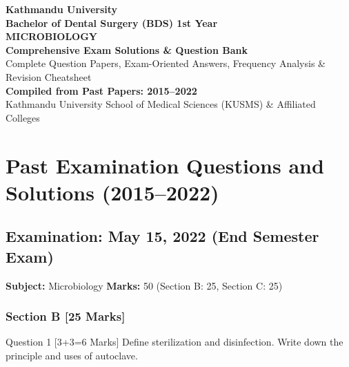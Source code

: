\documentclass[11pt,a4paper]{article}
\begin{document}
\begin{titlepage}
    \centering
    \vspace*{2cm}
    {\Huge \textbf{Kathmandu University}}\\[0.5cm]
    {\LARGE \textbf{Bachelor of Dental Surgery (BDS) 1st Year}}\\[1.5cm]
    {\Huge \textbf{MICROBIOLOGY}}\\[0.8cm]
    {\Large \textbf{Comprehensive Exam Solutions \& Question Bank}}\\[0.5cm]
    {\large Complete Question Papers, Exam-Oriented Answers, Frequency Analysis \& Revision Cheatsheet}\\[2cm]
    \vfill
    {\large \textbf{Compiled from Past Papers: 2015--2022}}\\[0.5cm]
    {\small Kathmandu University School of Medical Sciences (KUSMS) \& Affiliated Colleges}
    \vspace*{1.5cm}
\end{titlepage}

\tableofcontents
\newpage

\section{Past Examination Questions and Solutions (2015--2022)}

\subsection{Examination: May 15, 2022 (End Semester Exam)}
\textbf{Subject:} Microbiology \quad \textbf{Marks:} 50 (Section B: 25, Section C: 25)

\subsubsection{Section B [25 Marks]}

\begin{qbox}{Question 1 [3+3=6 Marks]}
Define sterilization and disinfection. Write down the principle and uses of autoclave.
\end{qbox}
\end{document}
